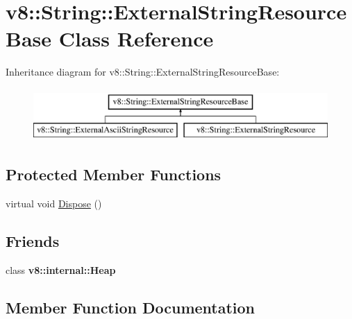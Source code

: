 \hypertarget{classv8_1_1_string_1_1_external_string_resource_base}{}\section{v8\+:\+:String\+:\+:External\+String\+Resource\+Base Class Reference}
\label{classv8_1_1_string_1_1_external_string_resource_base}
Inheritance diagram for v8\+:\+:String\+:\+:External\+String\+Resource\+Base\+:\begin{figure}[H]
\begin{center}
\leavevmode
\includegraphics[height=2.000000cm]{classv8_1_1_string_1_1_external_string_resource_base}
\end{center}
\end{figure}
\subsection*{Protected Member Functions}
\begin{DoxyCompactItemize}
\item 
virtual void \hyperlink{classv8_1_1_string_1_1_external_string_resource_base_af4720342ae31e1ab4656df3f15d069c0}{Dispose} ()
\end{DoxyCompactItemize}
\subsection*{Friends}
\begin{DoxyCompactItemize}
\item 
\hypertarget{classv8_1_1_string_1_1_external_string_resource_base_a2d52f783e6ad51ce2c8f89eb1ebc7599}{}class {\bfseries v8\+::internal\+::\+Heap}\label{classv8_1_1_string_1_1_external_string_resource_base_a2d52f783e6ad51ce2c8f89eb1ebc7599}

\end{DoxyCompactItemize}


\subsection{Member Function Documentation}
\hypertarget{classv8_1_1_string_1_1_external_string_resource_base_af4720342ae31e1ab4656df3f15d069c0}{}
